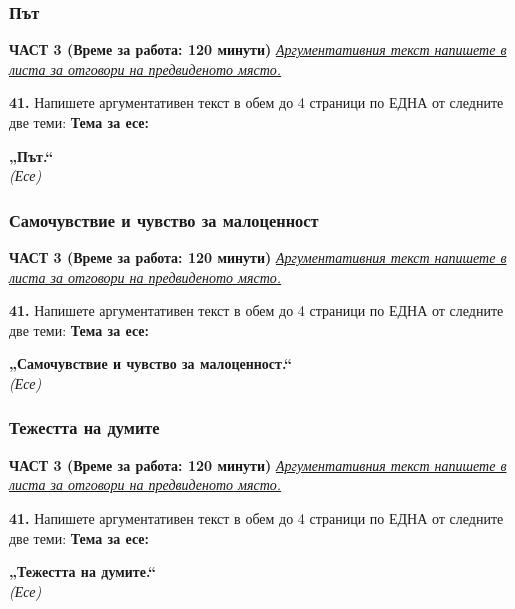 \documentclass[12pt,a4paper]{article}
\begin{document}
\subsubsection{Път}
\vspace{0.5cm}
\begin{center}
\textbf{ЧАСТ 3 (Време за работа: 120 минути)}
\vspace{0.2cm}
{\textit{\underline{Аргументативния текст напишете в листа за отговори на предвиденото място.}}}
\vspace{0.1cm}
\end{center}
\textbf{41.} Напишете аргументативен текст в обем до 4 страници по ЕДНА от следните две теми:
\vspace{0.2cm}
\textbf{Тема за есе:}
\vspace{0.1cm}
\begin{center}
\textbf{„Път.“}
\\
\textit{(Есе)}
\end{center}

\subsubsection{Самочувствие и чувство за малоценност}
\vspace{0.5cm}
\begin{center}
\textbf{ЧАСТ 3 (Време за работа: 120 минути)}
\vspace{0.2cm}
{\textit{\underline{Аргументативния текст напишете в листа за отговори на предвиденото място.}}}
\vspace{0.1cm}
\end{center}
\textbf{41.} Напишете аргументативен текст в обем до 4 страници по ЕДНА от следните две теми:
\vspace{0.2cm}
\textbf{Тема за есе:}
\vspace{0.1cm}
\begin{center}
\textbf{„Самочувствие и чувство за малоценност.“}
\\
\textit{(Есе)}
\end{center}

\subsubsection{Тежестта на думите}
\vspace{0.5cm}
\begin{center}
\textbf{ЧАСТ 3 (Време за работа: 120 минути)}
\vspace{0.2cm}
{\textit{\underline{Аргументативния текст напишете в листа за отговори на предвиденото място.}}}
\vspace{0.1cm}
\end{center}
\textbf{41.} Напишете аргументативен текст в обем до 4 страници по ЕДНА от следните две теми:
\vspace{0.2cm}
\textbf{Тема за есе:}
\vspace{0.1cm}
\begin{center}
\textbf{„Тежестта на думите.“}
\\
\textit{(Есе)}
\end{center}
\end{document}
